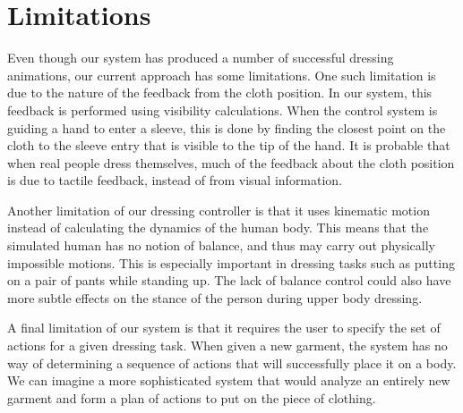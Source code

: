 \section{Limitations}

Even though our system has produced a number of successful dressing
animations, our current approach has some limitations.  One such
limitation is due to the nature of the feedback from the cloth position.
In our system, this feedback is performed using visibility calculations.
When the control system is guiding a hand to enter a sleeve, this is done
by finding the closest point on the cloth to the sleeve entry that is
visible to the tip of the hand.  It is probable that when real people
dress themselves, much of the feedback about the cloth position is due
to tactile feedback, instead of from visual information.

Another limitation of our dressing controller is that it uses kinematic
motion instead of calculating the dynamics of the human body.  This means
that the simulated human has no notion of balance, and thus may carry out
physically impossible motions.  This is especially important in dressing
tasks such as putting on a pair of pants while standing up.  The lack of
balance control could also have more subtle effects on the stance of the
person during upper body dressing.

A final limitation of our system is that it requires the user to specify
the set of actions for a given dressing task.  When given a new garment,
the system has no way of determining a sequence of actions that will
successfully place it on a body.  We can imagine a more sophisticated
system that would analyze an entirely new garment and form a plan of
actions to put on the piece of clothing.  

